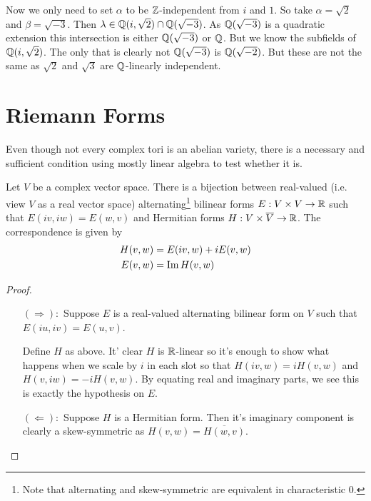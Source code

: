 \documentclass[11pt]{article}
\begin{document}
\begin{ex}
	Now we only need to set $\alpha$ to be $\mathbb{Z}$-independent from $i$ and $1$. So take $\alpha = \sqrt{2}$ and $\beta = \sqrt{-3}$. Then $\lambda \in \mathbb{Q}(i,\sqrt{2}) \cap \mathbb{Q}(\sqrt{-3})$. As $\mathbb{Q}(\sqrt{-3})$ is a quadratic extension this intersection is either $\mathbb{Q}(\sqrt{-3})$ or $\mathbb{Q}$. But we know the subfields of $\mathbb{Q}(i,\sqrt{2})$. The only that is clearly not $\mathbb{Q}(\sqrt{-3})$ is $\mathbb{Q}(\sqrt{-2})$. But these are not the same as $\sqrt{2}$ and $\sqrt{3}$ are $\mathbb{Q}$-linearly independent.
\end{ex}

\section{Riemann Forms}

Even though not every complex tori is an abelian variety, there is a necessary and sufficient condition using mostly linear algebra to test whether it is.

\begin{lem}
	Let $V$ be a complex vector space. There is a bijection between real-valued (i.e. view $V$ as a real vector space) alternating\footnote{Note that alternating and skew-symmetric are equivalent in characteristic $0$.} bilinear forms $E:V\times V \to \mathbb{R}$ such that $E(iv,iw)=E(w,v)$ and Hermitian forms $H:V\times\overline{V} \to \mathbb{R}$. The correspondence is given by
	\begin{align*}
		H(v,w) &= E(iv,w) + iE(v,w)
		\\
		E(v,w) &= \operatorname{Im} H(v,w)
	\end{align*}
\end{lem}
\begin{proof}
	\hfill
	\begin{enumerate}
		\item[$(\Rightarrow):$] Suppose $E$ is a real-valued alternating bilinear form on $V$ such that $E(iu,iv)=E(u,v)$.
		
		Define $H$ as above. It' clear $H$ is $\mathbb{R}$-linear so it's enough to show what happens when we scale by $i$ in each slot so that $H(iv,w)=iH(v,w)$ and $H(v,iw)=-iH(v,w)$. By equating real and imaginary parts, we see this is exactly the hypothesis on $E$.
		
		\item[$(\Leftarrow):$] Suppose $H$ is a Hermitian form. Then it's imaginary component is clearly a skew-symmetric as $H(v,w) = \overline{H(w,v)}$.
	\end{enumerate}
\end{proof}
\end{document}
